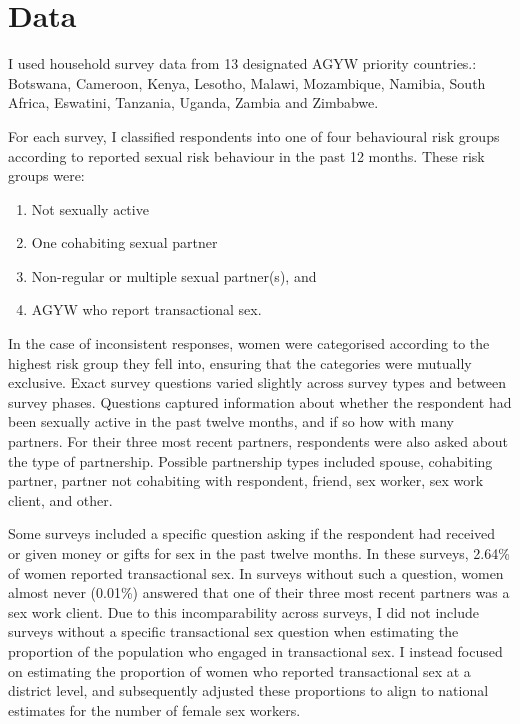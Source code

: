\documentclass[a4paper, nobind]{templates/ociamthesis}
\providecommand{\tightlist}{%
  \setlength{\itemsep}{0pt}\setlength{\parskip}{0pt}}
\begin{document}
\hypertarget{data}{%
\section{Data}\label{data}}

I used household survey data from 13 designated AGYW priority countries.: Botswana, Cameroon, Kenya, Lesotho, Malawi, Mozambique, Namibia, South Africa, Eswatini, Tanzania, Uganda, Zambia and Zimbabwe.

For each survey, I classified respondents into one of four behavioural risk groups according to reported sexual risk behaviour in the past 12 months.
These risk groups were:

\begin{enumerate}
\def\labelenumi{\arabic{enumi}.}
\tightlist
\item
  Not sexually active
\item
  One cohabiting sexual partner
\item
  Non-regular or multiple sexual partner(s), and
\item
  AGYW who report transactional sex.
\end{enumerate}

In the case of inconsistent responses, women were categorised according to the highest risk group they fell into, ensuring that the categories were mutually exclusive.
Exact survey questions varied slightly across survey types and between survey phases.
Questions captured information about whether the respondent had been sexually active in the past twelve months, and if so how with many partners.
For their three most recent partners, respondents were also asked about the type of partnership.
Possible partnership types included spouse, cohabiting partner, partner not cohabiting with respondent, friend, sex worker, sex work client, and other.

Some surveys included a specific question asking if the respondent had received or given money or gifts for sex in the past twelve months.
In these surveys, 2.64\% of women reported transactional sex.
In surveys without such a question, women almost never (0.01\%) answered that one of their three most recent partners was a sex work client.
Due to this incomparability across surveys, I did not include surveys without a specific transactional sex question when estimating the proportion of the population who engaged in transactional sex.
I instead focused on estimating the proportion of women who reported transactional sex at a district level, and subsequently adjusted these proportions to align to national estimates for the number of female sex workers.
\end{document}
